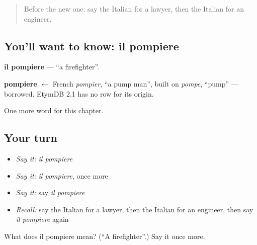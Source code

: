 \label{lesson:IT-C112-pompiere}



\begin{quote}
Before the new one: say the Italian for a lawyer, then the Italian for an engineer.
\end{quote}

\subsection*{You'll want to know: il pompiere}
\textbf{il pompiere} — \textquotedblleft{}a firefighter\textquotedblright{}.

\begin{cousinweb}
\textbf{pompiere} $\leftarrow$ French \emph{pompier}, \textquotedblleft{}a pump man\textquotedblright{}, built on \emph{pompe}, \textquotedblleft{}pump\textquotedblright{} — borrowed. EtymDB 2.1 has no row for its origin.
\end{cousinweb}

\begin{grammarlens}[title={What you've built}]
One more word for this chapter.
\end{grammarlens}

\subsection*{Your turn}
\begin{itemize}
\raggedright
  \item \emph{Say it:} \emph{il pompiere}
  \item \emph{Say it:} \emph{il pompiere}, once more
  \item \emph{Say it:} say \emph{il pompiere}
  \item \emph{Recall:} say the Italian for a lawyer, then the Italian for an engineer, then say \emph{il pompiere} again
\end{itemize}

\begin{tcolorbox}[breakable,colback=teal!4,colframe=teal!35!black,title={Before you move on}]
What does il pompiere mean? (\textquotedblleft{}A firefighter\textquotedblright{}.) Say it once more.
\end{tcolorbox}
